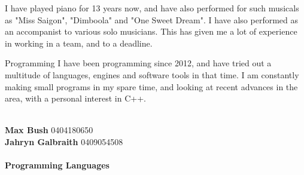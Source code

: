 \documentclass[9pt]{developercv}
\newcommand{\CC}{C\nolinebreak\hspace{-.05em}\raisebox{.4ex}{\tiny\bf +}\nolinebreak\hspace{-.10em}\raisebox{.4ex}{\tiny\bf +}}
\def\CC{{C\nolinebreak[4]\hspace{-.05em}\raisebox{.4ex}{\tiny\bf ++}}}
\begin{document}
\begin{minipage}[t]{0.6\textwidth}
\begin{entrylist}
				{}
				{I have played piano for 13 years now, and have also performed for such musicals as "Miss Saigon", "Dimboola" and "One Sweet Dream". I have also performed as an accompanist to various solo musicians. This has given me a lot of experience in working in a team, and to a deadline.}
		\end{entrylist}
		\begin{entrylist}
			\entry
				{\vphantom{1.0}}
				{Programming}
				{}
				{I have been programming since 2012, and have tried out a multitude of languages, engines and software tools in that time. I am constantly making small programs in my spare time, and looking at recent advances in the area, with a personal interest in C++.}
		\end{entrylist}
	\end{minipage}
\begin{minipage}[t]{0.1\textwidth}
\hphantom{0.1}
\end{minipage}
	\begin{minipage}[t]{0.3\textwidth}
		\\
		\textbf{Max Bush} 0404180650\\
		\textbf{Jahryn Galbraith} 0409054508\\

			\\\textbf{Programming Languages}\\
			\begin{barchart}{3.0}
				\baritem{\CC}{100}
			\end{barchart}
	\end{minipage}
\end{document}
